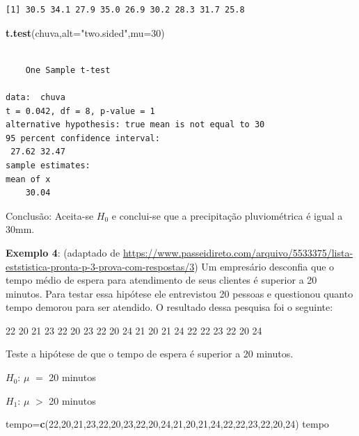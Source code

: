 \documentclass[12pt,brazil,oneside]{book}
\newenvironment{Shaded}{\begin{snugshade}}{\end{snugshade}}
\newcommand{\DataTypeTok}[1]{\textcolor[rgb]{0.13,0.29,0.53}{#1}}
\newcommand{\DecValTok}[1]{\textcolor[rgb]{0.00,0.00,0.81}{#1}}
\newcommand{\KeywordTok}[1]{\textcolor[rgb]{0.13,0.29,0.53}{\textbf{#1}}}
\newcommand{\NormalTok}[1]{#1}
\newcommand{\StringTok}[1]{\textcolor[rgb]{0.31,0.60,0.02}{#1}}
\begin{document}
\begin{verbatim}
[1] 30.5 34.1 27.9 35.0 26.9 30.2 28.3 31.7 25.8
\end{verbatim}

\begin{Shaded}
\begin{Highlighting}[]
\KeywordTok{t.test}\NormalTok{(chuva,}\DataTypeTok{alt=}\StringTok{"two.sided"}\NormalTok{,}\DataTypeTok{mu=}\DecValTok{30}\NormalTok{)}
\end{Highlighting}
\end{Shaded}

\begin{verbatim}

    One Sample t-test

data:  chuva
t = 0.042, df = 8, p-value = 1
alternative hypothesis: true mean is not equal to 30
95 percent confidence interval:
 27.62 32.47
sample estimates:
mean of x 
    30.04 
\end{verbatim}

Conclusão: Aceita-se \(H_0\) e conclui-se que a precipitação pluviométrica é igual a 30mm.

\textbf{Exemplo 4}: (adaptado de \url{https://www.passeidireto.com/arquivo/5533375/lista-eststistica-pronta-p-3-prova-com-respostas/3}) Um empresário desconfia que o tempo médio de espera para atendimento de seus clientes é superior a 20 minutos. Para testar essa hipótese ele entrevistou 20 pessoas e questionou quanto tempo demorou para ser atendido. O resultado dessa pesquisa foi o seguinte:

22 20 21 23 22 20 23 22 20 24 21 20 21 24 22 22 23 22 20 24

Teste a hipótese de que o tempo de espera é superior a 20 minutos.

\textbf{\(H_0\)}: \(\mu\) \(=\) 20 minutos

\textbf{\(H_1\)}: \(\mu\) \(>\) 20 minutos

\begin{Shaded}
\begin{Highlighting}[]
\NormalTok{tempo=}\KeywordTok{c}\NormalTok{(}\DecValTok{22}\NormalTok{,}\DecValTok{20}\NormalTok{,}\DecValTok{21}\NormalTok{,}\DecValTok{23}\NormalTok{,}\DecValTok{22}\NormalTok{,}\DecValTok{20}\NormalTok{,}\DecValTok{23}\NormalTok{,}\DecValTok{22}\NormalTok{,}\DecValTok{20}\NormalTok{,}\DecValTok{24}\NormalTok{,}\DecValTok{21}\NormalTok{,}\DecValTok{20}\NormalTok{,}\DecValTok{21}\NormalTok{,}\DecValTok{24}\NormalTok{,}\DecValTok{22}\NormalTok{,}\DecValTok{22}\NormalTok{,}\DecValTok{23}\NormalTok{,}\DecValTok{22}\NormalTok{,}\DecValTok{20}\NormalTok{,}\DecValTok{24}\NormalTok{)}
\NormalTok{tempo}
\end{Highlighting}
\end{Shaded}
\end{document}
